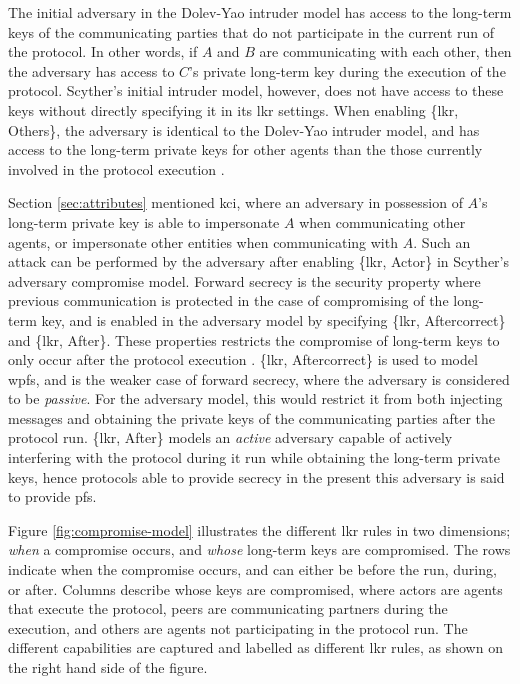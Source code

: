 The initial adversary in the Dolev-Yao intruder model has access to the long-term keys of the communicating parties that do not participate in the current run of the protocol. In other words, if $A$ and $B$ are communicating with each other, then the adversary has access to $C$'s private long-term key during the execution of the protocol. Scyther's initial intruder model, however, does not have access to these keys without directly specifying it in its \gls{lkr} settings. When enabling \{\gls{lkr}, Others\}, the adversary is identical to the Dolev-Yao intruder model, and has access to the long-term private keys for other agents than the those currently involved in the protocol execution \cite{basin2010modeling}.

Section \ref{sec:attributes} mentioned \gls{kci}, where an adversary in possession of $A$'s long-term private key is able to impersonate $A$ when communicating other agents, or impersonate other entities when communicating with $A$. Such an attack can be performed by the adversary after enabling \{\gls{lkr}, Actor\} in Scyther's adversary compromise model. Forward secrecy is the security property where previous communication is protected in the case of compromising of the long-term key, and is enabled in the adversary model by specifying \{\gls{lkr}, Aftercorrect\} and \{\gls{lkr}, After\}. These properties restricts the compromise of long-term keys to only occur after the protocol execution \cite{basin2010modeling}. \{\gls{lkr}, Aftercorrect\} is used to model \gls{wpfs}, and is the weaker case of forward secrecy, where the adversary is considered to be \emph{passive}. For the adversary model, this would restrict it from both injecting messages and obtaining the private keys of the communicating parties after the protocol run.  \{\gls{lkr}, After\} models an \emph{active} adversary capable of actively interfering with the protocol during it run while obtaining the long-term private keys, hence protocols able to provide secrecy in the present this adversary is said to provide \gls{pfs}. 



Figure \ref{fig:compromise-model} illustrates the different \gls{lkr} rules in two dimensions; \emph{when} a compromise occurs, and \emph{whose} long-term keys are compromised. The rows indicate when the compromise occurs, and can either be before the run, during, or after. Columns describe whose keys are compromised, where actors are agents that execute the protocol, peers are communicating partners during the execution, and others are agents not participating in the protocol run. The different capabilities are captured and labelled as different \gls{lkr} rules, as shown on the right hand side of the figure. 

